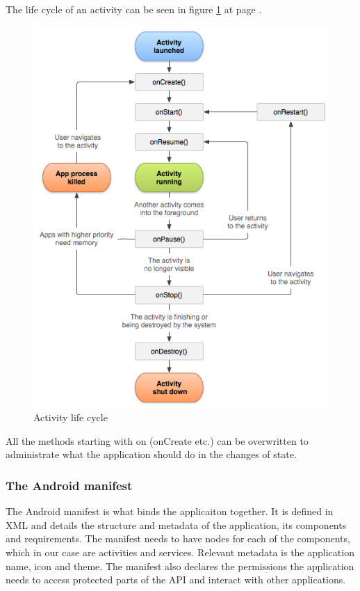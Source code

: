 The life cycle of an activity can be seen in figure \ref{fig:lifecycle} at page \pageref{fig:lifecycle}.
\begin{figure}
	\includegraphics[width=\textwidth]{activity_lifecycle}
	\caption{Activity life cycle\cite{bib:alc}}
	\label{fig:lifecycle}
\end{figure}

All the methods starting with on (onCreate etc.) can be overwritten to administrate what the application should do in the changes of state.

\subsubsection{The Android manifest}
The Android manifest\cite{bib:aman} is what binds the applicaiton together. It is defined in XML and details the structure and metadata of the application, its components and requirements. The manifest needs to have nodes for each of the components, which in our case are activities and services. Relevant metadata is the application name, icon and theme. The manifest also declares the permissions the application needs to access protected parts of the API and interact with other applications.


